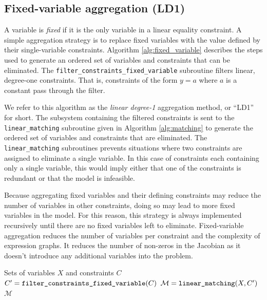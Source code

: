 \documentclass[smallextended]{svjour3}
\newcommand{\rev}[1]{{#1}}
\begin{document}
\subsection{Fixed-variable aggregation \rev{(LD1)}}\label{sec:fixed_var_elimination}
A variable is {\it fixed} if it is the only variable in a linear equality constraint.
A simple aggregation strategy is to replace fixed variables with the value defined by
their single-variable constraints. Algorithm \ref{alg:fixed_variable}
describes the steps used to generate an ordered set of variables and constraints that
can be eliminated. The {\tt filter\_constraints\_fixed\_variable} subroutine filters
linear, degree-one constraints. That is, constraints of the form $y = a$ where $a$ is
a constant pass through the filter.

We refer to this algorithm as the {\it linear degree-1} aggregation method, or ``LD1'' for short.
The subsystem containing the filtered constraints is sent
to the {\tt linear\_matching} subroutine given in Algorithm \ref{alg:matching} to generate
the ordered set of variables and constraints that are eliminated.
The {\tt linear\_matching} subroutines prevents situations where two constraints are assigned to
eliminate a single variable. In this case of constraints each containing only a single variable,
this would imply either that one of the constraints is redundant or that the model is infeasible.

Because aggregating fixed variables and their defining constraints may reduce the number of
variables in other constraints, doing so may lead to more fixed variables in the model.
For this reason, this strategy is always implemented recursively until there are no fixed
variables left to eliminate.
Fixed-variable aggregation reduces the number of variables per constraint and the complexity
of expression graphs. It reduces the number of non-zeros in the Jacobian as it doesn't
introduce any additional variables into the problem.
\begin{algorithm}
  \caption{: {\tt degree\_1\_aggregation\_set}}
  \begin{algorithmic}[1]
     Sets of variables $X$ and constraints $C$
    \State $C' = \text{\tt filter\_constraints\_fixed\_variable}(C)$
    \State $\mathcal{M} = \text{\tt linear\_matching}(X, C')$
     $\mathcal{M}$
  \end{algorithmic}
  \label{alg:fixed_variable}
\end{algorithm}
\end{document}
